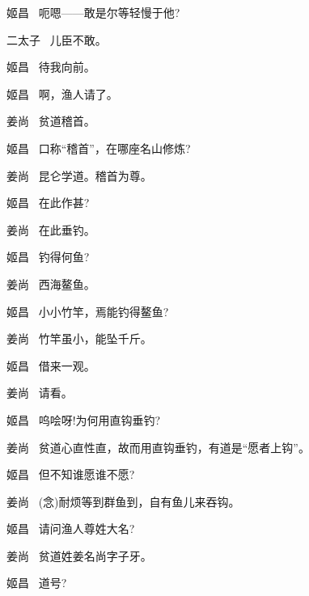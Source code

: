 {姬昌\hspace{30pt}~ 呃嗯------敢是尔等轻慢于他?

{\akai 二}太子\hspace{20pt}~ 儿臣不敢。

姬昌\hspace{30pt}~ 待我向前。

姬昌\hspace{30pt}~ 啊，渔人请了。

姜尚\hspace{30pt}~ 贫道稽首。

姬昌\hspace{30pt}~ 口称``稽首''，在哪座名山修炼?

姜尚\hspace{30pt}~ 昆仑学道。稽首为尊。

姬昌\hspace{30pt}~ 在此作甚?

姜尚\hspace{30pt}~ 在此垂钓。

姬昌\hspace{30pt}~ 钓得何鱼?

姜尚\hspace{30pt}~ 西海鳌鱼。

姬昌\hspace{30pt}~ 小小竹竿，焉能钓得鳌鱼?

姜尚\hspace{30pt}~ 竹竿虽小，能坠千斤。

姬昌\hspace{30pt}~ 借来一观。

姜尚\hspace{30pt}~ 请看。

姬昌\hspace{30pt}~ 呜哙呀!为何用直钩垂钓?

姜尚\hspace{30pt}~ 贫道心直性直，故而用直钩垂钓，有道是``愿者上钩''。

姬昌\hspace{30pt}~ 但不知谁愿谁不愿?

姜尚\hspace{30pt}~ ({\akai 念})耐烦等到群鱼到，自有鱼儿来吞钩。

姬昌\hspace{30pt}~ 请问渔人尊姓大名?

姜尚\hspace{30pt}~ 贫道姓姜名尚字子牙。

姬昌\hspace{30pt}~ 道号?

}
